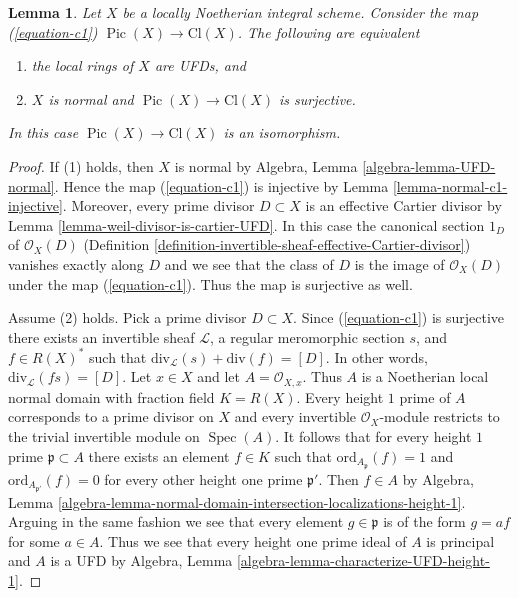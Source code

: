 \documentclass[10pt,a4paper]{amsart}
\theoremstyle{plain}
\newtheorem{lemma}[subsection]{Lemma}
\theoremstyle{definition}
\theoremstyle{remark}
\numberwithin{equation}{subsection}
\def\Spec{\mathop{\mathrm{Spec}}}
\def\Pic{\mathop{\mathrm{Pic}}\nolimits}
\begin{document}
\begin{lemma}
\label{lemma-local-rings-UFD-c1-bijective}
Let $X$ be a locally Noetherian integral scheme. Consider the map
(\ref{equation-c1}) $\Pic(X) \to \text{Cl}(X)$.
The following are equivalent
\begin{enumerate}
\item the local rings of $X$ are UFDs, and
\item $X$ is normal and $\Pic(X) \to \text{Cl}(X)$
is surjective.
\end{enumerate}
In this case $\Pic(X) \to \text{Cl}(X)$ is an isomorphism.
\end{lemma}

\begin{proof}
If (1) holds, then $X$ is normal by
Algebra, Lemma \ref{algebra-lemma-UFD-normal}.
Hence the map (\ref{equation-c1}) is injective by
Lemma \ref{lemma-normal-c1-injective}. Moreover,
every prime divisor $D \subset X$ is an effective
Cartier divisor by Lemma \ref{lemma-weil-divisor-is-cartier-UFD}.
In this case the canonical section $1_D$ of $\mathcal{O}_X(D)$
(Definition \ref{definition-invertible-sheaf-effective-Cartier-divisor})
vanishes exactly along $D$ and we see that the class of $D$ is the
image of $\mathcal{O}_X(D)$ under the map (\ref{equation-c1}).
Thus the map is surjective as well.

\medskip\noindent
Assume (2) holds. Pick a prime divisor $D \subset X$.
Since (\ref{equation-c1}) is surjective there exists an invertible
sheaf $\mathcal{L}$, a regular meromorphic section $s$, and $f \in R(X)^*$
such that $\text{div}_\mathcal{L}(s) + \text{div}(f) = [D]$.
In other words, $\text{div}_\mathcal{L}(fs) = [D]$.
Let $x \in X$ and let $A = \mathcal{O}_{X, x}$. Thus $A$ is
a Noetherian local normal domain with fraction field $K = R(X)$.
Every height $1$ prime of $A$ corresponds to a prime divisor on $X$
and every invertible $\mathcal{O}_X$-module restricts to the
trivial invertible module on $\Spec(A)$. It follows that for every
height $1$ prime $\mathfrak p \subset A$ there exists an element $f \in K$
such that $\text{ord}_{A_\mathfrak p}(f) = 1$ and
$\text{ord}_{A_{\mathfrak p'}}(f) = 0$ for every other
height one prime $\mathfrak p'$. Then $f \in A$ by Algebra, Lemma
\ref{algebra-lemma-normal-domain-intersection-localizations-height-1}.
Arguing in the same fashion we see that every element $g \in \mathfrak p$
is of the form $g = af$ for some $a \in A$. Thus we see that every
height one prime ideal of $A$ is principal and $A$ is a UFD
by Algebra, Lemma \ref{algebra-lemma-characterize-UFD-height-1}.
\end{proof}
\end{document}
